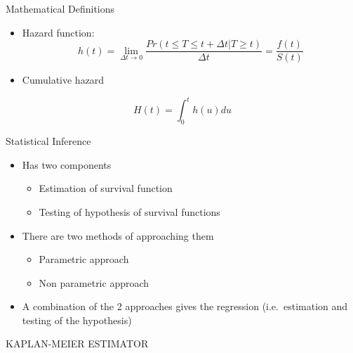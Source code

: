 \documentclass[ignorenonframetext,]{beamer}
\begin{document}
\begin{frame}{Mathematical Definitions}

\begin{itemize}
\itemsep1pt\parskip0pt
\item
  Hazard function: \[
  h(t)=\lim_{\Delta t \to 0} \frac{Pr(t\leq T \leq t + \Delta t|T\geq t)}{\Delta t} = \frac{f(t)}{S(t)}
  \]
\item
  Cumulative hazard
\end{itemize}

\[
H(t)=\int_{0}^{t} h(u) du
\]

\end{frame}

\begin{frame}{Statistical Inference}

\begin{itemize}
\itemsep1pt\parskip0pt
\item
  Has two components

  \begin{itemize}
  \itemsep1pt\parskip0pt
  \item
    Estimation of survival function
  \item
    Testing of hypothesis of survival functions
  \end{itemize}
\item
  There are two methods of approaching them

  \begin{itemize}
  \itemsep1pt\parskip0pt
  \item
    Parametric approach
  \item
    Non parametric approach
  \end{itemize}
\item
  A combination of the 2 approaches gives the regression
  (i.e.~estimation and testing of the hypothesis)
\end{itemize}

\end{frame}

\begin{frame}{KAPLAN-MEIER ESTIMATOR}

\end{frame}
\end{document}
